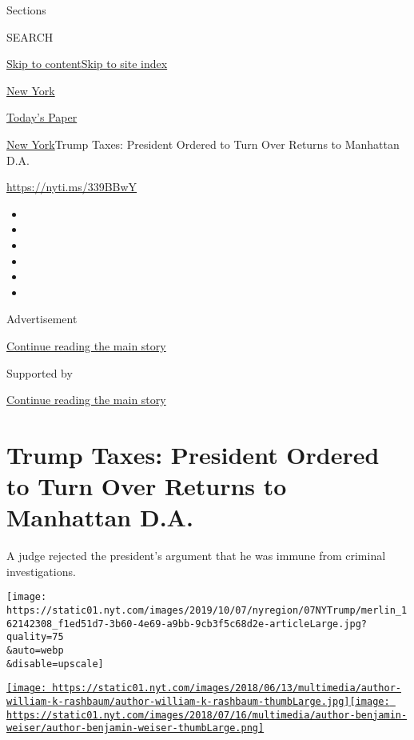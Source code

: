 Sections

SEARCH

\protect\hyperlink{site-content}{Skip to
content}\protect\hyperlink{site-index}{Skip to site index}

\href{https://www.nytimes.com/section/nyregion}{New York}

\href{https://myaccount.nytimes.com/auth/login?response_type=cookie\&client_id=vi}{}

\href{https://www.nytimes.com/section/todayspaper}{Today's Paper}

\href{/section/nyregion}{New York}\textbar{}Trump Taxes: President
Ordered to Turn Over Returns to Manhattan D.A.

\url{https://nyti.ms/339BBwY}

\begin{itemize}
\item
\item
\item
\item
\item
\item
\end{itemize}

Advertisement

\protect\hyperlink{after-top}{Continue reading the main story}

Supported by

\protect\hyperlink{after-sponsor}{Continue reading the main story}

\hypertarget{trump-taxes-president-ordered-to-turn-over-returns-to-manhattan-da}{%
\section{Trump Taxes: President Ordered to Turn Over Returns to
Manhattan
D.A.}\label{trump-taxes-president-ordered-to-turn-over-returns-to-manhattan-da}}

A judge rejected the president's argument that he was immune from
criminal investigations.

\texttt{[image: https://static01.nyt.com/images/2019/10/07/nyregion/07NYTrump/merlin\_162142308\_f1ed51d7-3b60-4e69-a9bb-9cb3f5c68d2e-articleLarge.jpg?quality=75\\\&auto=webp\\\&disable=upscale]}

\href{https://www.nytimes.com/by/william-k-rashbaum}{\texttt{[image: https://static01.nyt.com/images/2018/06/13/multimedia/author-william-k-rashbaum/author-william-k-rashbaum-thumbLarge.jpg]}}\href{https://www.nytimes.com/by/benjamin-weiser}{\texttt{[image: https://static01.nyt.com/images/2018/07/16/multimedia/author-benjamin-weiser/author-benjamin-weiser-thumbLarge.png]}}

